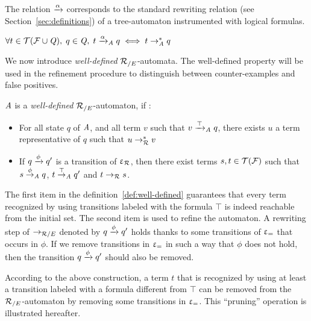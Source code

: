 The relation $\xrightarrow{\alpha}$ corresponds to the standard rewriting
relation (see Section~\ref{sec:definitions}) of a tree-automaton
instrumented with logical formulas.

\begin{theorem}\label{th:equiv}{\quad\quad
  $\forall t\in\mathcal{ T(F \cup \mathit Q)},\; q \in \mathit Q,\; t \xrightarrow{\alpha}_\mathit A q \; \Longleftrightarrow \; t \rightarrow_\mathit A^* q$}
\end{theorem}

We now introduce {\em well-defined} ${\mathcal R_{/E}}$-automata. The well-defined
property will be used in the refinement procedure to
distinguish between counter-examples and false positives. 


\begin{definition}
  \label{def:well-defined}
  $\mathit A$ is a \emph{well-defined} ${\mathcal R_{/E}}$-automaton, if :
  \begin{itemize}
  \item For all state $q$ of $\mathit A$, and all term $v$ such that
    $v \xrightarrow{\top}_\mathit A q$, there exists $u$ a term representative
    of $q$ such that $u \rightarrow^*_\mathcal R v$
  \item If $q \xrightarrow{\phi} q'$ is a transition of $\upvarepsilon_{\mathcal R}$, then there exist terms
    $s,t\in \mathcal{T(F)}$ such that $s\stackrel{\phi}{\rightarrow}_\mathit A q$, $t\stackrel{\top}{\rightarrow}_\mathit A q'$
    and $t \rightarrow_\mathcal R s$.
  \end{itemize}
\end{definition}

\noindent
The first item in the definition~\ref{def:well-defined} guarantees
that every term recognized by using transitions labeled with the
formula $\top$ is indeed reachable from the initial set.  The second
item is used to refine the automaton. A rewriting step of $\rightarrow_{\mathcal R/E}$
denoted by $q \xrightarrow{\phi} q'$ holds thanks to some transitions of
$\upvarepsilon_{=}$ that occurs in $\phi$. If we remove transitions in $\upvarepsilon_{=}$ in
such a way that $\phi$ does not hold, then the transition $q
\xrightarrow{\phi} q'$ should also be removed.

According to the above construction, a term $t$ that is recognized by
using at least a transition labeled with a formula different from $\top$
can be removed from the ${\mathcal R_{/E}}$-automaton by removing some transitions
in $\upvarepsilon_{=}$. This ``pruning'' operation is illustrated hereafter.

